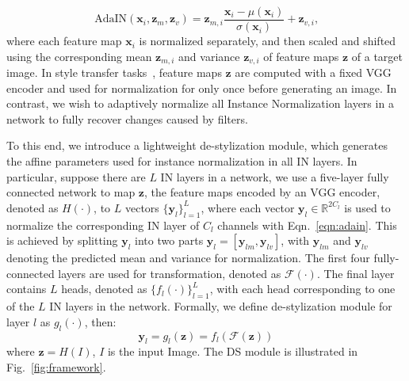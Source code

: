 \documentclass[letterpaper]{article} %
\newcommand{\cmt}[1]{{\footnotesize\textcolor{red}{#1}}}
\newcommand{\todo}[1]{\cmt{(TODO: #1)}}
\newcommand{\xx}{{\bm x}}
\newcommand{\yy}{{\bm y}}
\newcommand{\zz}{{\bm z}}
\begin{document}
\begin{equation}
\label{eqn:adain}
	\textrm{AdaIN}(\xx_i,\zz_{m}, \zz_{v}) = \zz_{m,i}\frac{\xx_i-\mu(\xx_i)}{\sigma(\xx_i)} + \zz_{v,i}	\textrm{,}	%
\end{equation}
where each feature map $\xx_i$ is normalized separately, and then scaled and shifted using the corresponding mean $\zz_{m,i}$ and variance $\zz_{v,i}$ of feature maps $\zz$ of a target image.  In style transfer tasks~\cite{huang2017adain}, feature maps $\zz$ are computed with a fixed VGG encoder and used for normalization for only once before generating an image. In contrast, we wish to adaptively normalize all Instance Normalization layers in a network to fully recover changes caused by filters. 

To this end, we introduce a lightweight de-stylization module, which generates the affine parameters used for instance normalization in all IN layers. In particular, suppose there are $L$ IN layers in a network, we use a five-layer fully connected network to map $\zz$, the feature maps encoded by an VGG encoder, denoted as $H(\cdot)$, to $L$ vectors $\{\yy_l\}_{l=1}^{L}$, where each vector $\yy_l\in \mathbb{R}^{2C_l}$ is used to normalize the corresponding IN layer of $C_l$ channels with Eqn.~\ref{eqn:adain}. This is achieved by splitting $\yy_l$ into two parts $\yy_l = [\yy_{lm}, \yy_{lv}]$, with $\yy_{lm}$ and $\yy_{lv}$ denoting the predicted mean and variance for normalization. 
The first four fully-connected layers are used for transformation, denoted as $\mathcal{F(\cdot)}$. The final layer contains $L$ heads, denoted as  $\{f_l(\cdot)\}_{l=1}^L$, with each head corresponding to one of the $L$ IN layers in the network. 
Formally, we define de-stylization module for layer $l$ as $g_l(\cdot)$, then:
\begin{equation}
\label{eqn:head}
\yy_l = g_l(\zz) = f_l(\mathcal{F}(\zz))
\end{equation}
where $\zz=H(I)$, $I$ is the input Image. The DS module is illustrated in Fig.~\ref{fig:framework}.

\end{document}
